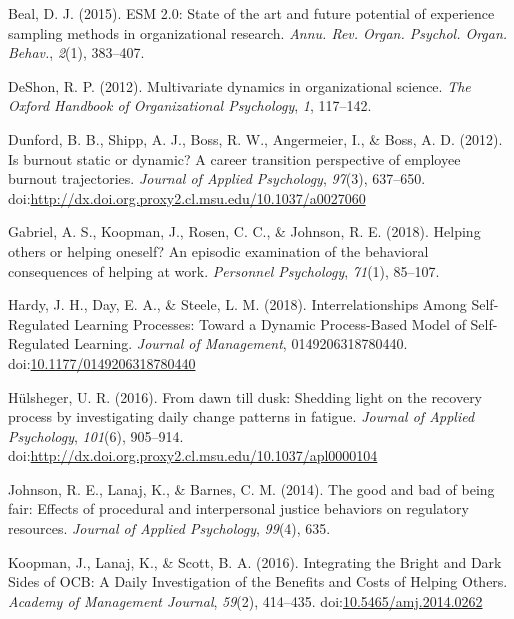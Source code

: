 \documentclass[english,,man]{apa6}
\theoremstyle{definition}
\theoremstyle{definition}
\theoremstyle{definition}
\theoremstyle{remark}
\begin{document}
\leavevmode\hypertarget{ref-beal_esm_2015}{}%
Beal, D. J. (2015). ESM 2.0: State of the art and future potential of
experience sampling methods in organizational research. \emph{Annu. Rev.
Organ. Psychol. Organ. Behav.}, \emph{2}(1), 383--407.

\leavevmode\hypertarget{ref-deshon_multivariate_2012}{}%
DeShon, R. P. (2012). Multivariate dynamics in organizational science.
\emph{The Oxford Handbook of Organizational Psychology}, \emph{1},
117--142.

\leavevmode\hypertarget{ref-dunford_is_2012}{}%
Dunford, B. B., Shipp, A. J., Boss, R. W., Angermeier, I., \& Boss, A.
D. (2012). Is burnout static or dynamic? A career transition perspective
of employee burnout trajectories. \emph{Journal of Applied Psychology},
\emph{97}(3), 637--650.
doi:\href{https://doi.org/http://dx.doi.org.proxy2.cl.msu.edu/10.1037/a0027060}{http://dx.doi.org.proxy2.cl.msu.edu/10.1037/a0027060}

\leavevmode\hypertarget{ref-gabriel_helping_2018}{}%
Gabriel, A. S., Koopman, J., Rosen, C. C., \& Johnson, R. E. (2018).
Helping others or helping oneself? An episodic examination of the
behavioral consequences of helping at work. \emph{Personnel Psychology},
\emph{71}(1), 85--107.

\leavevmode\hypertarget{ref-hardy_interrelationships_2018}{}%
Hardy, J. H., Day, E. A., \& Steele, L. M. (2018). Interrelationships
Among Self-Regulated Learning Processes: Toward a Dynamic Process-Based
Model of Self-Regulated Learning. \emph{Journal of Management},
0149206318780440.
doi:\href{https://doi.org/10.1177/0149206318780440}{10.1177/0149206318780440}

\leavevmode\hypertarget{ref-hulsheger_dawn_2016}{}%
Hülsheger, U. R. (2016). From dawn till dusk: Shedding light on the
recovery process by investigating daily change patterns in fatigue.
\emph{Journal of Applied Psychology}, \emph{101}(6), 905--914.
doi:\href{https://doi.org/http://dx.doi.org.proxy2.cl.msu.edu/10.1037/apl0000104}{http://dx.doi.org.proxy2.cl.msu.edu/10.1037/apl0000104}

\leavevmode\hypertarget{ref-johnson_good_2014}{}%
Johnson, R. E., Lanaj, K., \& Barnes, C. M. (2014). The good and bad of
being fair: Effects of procedural and interpersonal justice behaviors on
regulatory resources. \emph{Journal of Applied Psychology},
\emph{99}(4), 635.

\leavevmode\hypertarget{ref-koopman_integrating_2016}{}%
Koopman, J., Lanaj, K., \& Scott, B. A. (2016). Integrating the Bright
and Dark Sides of OCB: A Daily Investigation of the Benefits and Costs
of Helping Others. \emph{Academy of Management Journal}, \emph{59}(2),
414--435.
doi:\href{https://doi.org/10.5465/amj.2014.0262}{10.5465/amj.2014.0262}
\end{document}
